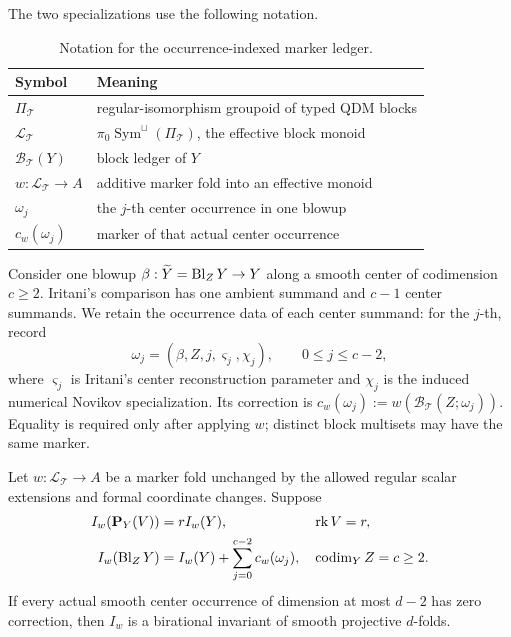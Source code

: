The two specializations use the following notation.
\begin{table}[ht]
\centering
\begin{tabular}{@{}ll@{}}
\toprule
Symbol & Meaning \\
\midrule
\(\Pi_{\mathcal T}\) & regular-isomorphism groupoid of typed QDM blocks \\
\(\mathcal L_{\mathcal T}\) &
  \(\pi_0\operatorname{Sym}^{\sqcup}(\Pi_{\mathcal T})\), the effective block monoid \\
\(\mathcal B_{\mathcal T}(Y)\) & block ledger of \(Y\) \\
\(w:\mathcal L_{\mathcal T}\to A\) & additive marker fold into an effective monoid \\
\(\omega_j\) & the \(j\)-th center occurrence in one blowup \\
\(c_w(\omega_j)\) & marker of that actual center occurrence \\
\bottomrule
\end{tabular}
\caption{Notation for the occurrence-indexed marker ledger.}
\label{tab:marker-notation}
\end{table}

Consider one blowup
\(\beta:\widetilde Y=\operatorname{Bl}_ZY\to Y\) along a smooth center of codimension
\(c\ge2\).  Iritani's comparison has one ambient summand and \(c-1\) center
summands.  We retain the occurrence data of each center summand: for the
\(j\)-th, record
\[
 \omega_j=(\beta,Z,j,\varsigma_j,\chi_j),
 \qquad 0\le j\le c-2,
\]
where \(\varsigma_j\) is Iritani's center reconstruction parameter and
\(\chi_j\) is the induced numerical Novikov specialization.  Its correction
is
\(c_w(\omega_j):=w(\mathcal B_{\mathcal T}(Z;\omega_j))\).  Equality is
required only after applying \(w\); distinct block multisets may have the same
marker.

\begin{theorem}
\label{thm:marker-ledger}
%
%
%
Let \(w:\mathcal L_{\mathcal T}\to A\) be a marker fold unchanged by the
allowed regular scalar extensions and formal coordinate changes.  Suppose
\begin{align}
 I_w(\mathbf P_Y(V))&=rI_w(Y),
 &&\operatorname{rk} V=r,                                      \label{eq:marker-pbundle}\\
 I_w(\operatorname{Bl}_ZY)&=I_w(Y)+\sum_{j=0}^{c-2}c_w(\omega_j),
 &&\operatorname{codim}_YZ=c\ge2.                \label{eq:marker-blowup}
\end{align}
If every actual smooth center occurrence of dimension at most \(d-2\) has
zero correction, then \(I_w\) is a birational invariant of smooth projective
\(d\)-folds.
\end{theorem}

